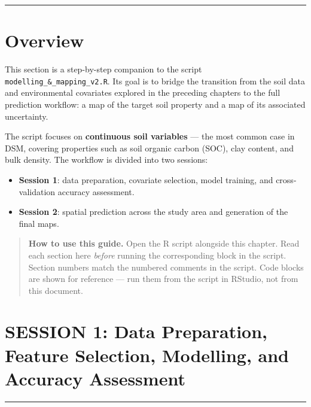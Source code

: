 \documentclass[
  10pt,
  b5paper,
  oneside]{book}
\providecommand{\tightlist}{%
  \setlength{\itemsep}{0pt}\setlength{\parskip}{0pt}}
\begin{document}
\begin{center}\rule{0.5\linewidth}{0.5pt}\end{center}

\section*{Overview}\label{overview}

This section is a step-by-step companion to the script
\texttt{modelling\_\&\_mapping\_v2.R}. Its goal is to bridge the transition from
the soil data and environmental covariates explored in the preceding
chapters to the full prediction workflow: a map of the target soil
property and a map of its associated uncertainty.

The script focuses on \textbf{continuous soil variables} --- the most common
case in DSM, covering properties such as soil organic carbon (SOC), clay
content, and bulk density. The workflow is divided into two
sessions:

\begin{itemize}
\tightlist
\item
  \textbf{Session 1}: data preparation, covariate selection, model training,
  and cross-validation accuracy assessment.
\item
  \textbf{Session 2}: spatial prediction across the study area and generation
  of the final maps.
\end{itemize}

\begin{quote}
\textbf{How to use this guide.} Open the R script alongside this chapter.
Read each section here \emph{before} running the corresponding block in the
script. Section numbers match the numbered comments in the script.
Code blocks are shown for reference --- run them from the script in
RStudio, not from this document.
\end{quote}

\section*{SESSION 1: Data Preparation, Feature Selection, Modelling, and Accuracy Assessment}\label{session-1-data-preparation-feature-selection-modelling-and-accuracy-assessment}

\begin{center}\rule{0.5\linewidth}{0.5pt}\end{center}
\end{document}
